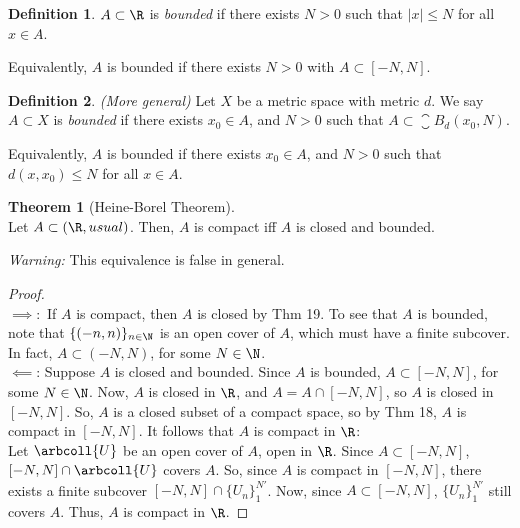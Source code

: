 \documentclass[a5paper]{article}
\theoremstyle{definition}%
\newtheorem{theorem}{Theorem}
\newtheorem*{definition*}{Definition}
\numberwithin{exercise}{section}
\theoremstyle{remark}%
\begin{document}
\begin{definition*}
$A\subset\R$ is \emph{bounded} if there exists $N>0$ such that $|x|\leq N$ for all $x \in A$. 

Equivalently, $A$ is bounded if there exists $N>0$ with $A\subset [-N,N]$. 
\end{definition*}

\begin{definition*}\textit{(More general)}
Let $X$ be a metric space with metric $d$. We say $A\subset X$ is \emph{bounded} if there exists $x_0\in A$, and $N>0$ such that $A\subset \closure{B_d}(x_0,N)$. 

Equivalently, $A$ is bounded if there exists $x_0\in A$, and $N>0$ such that $d(x,x_0)\leq N$ for all $x\in A$. 
\end{definition*}

\begin{highlight}
\begin{theorem}[Heine-Borel Theorem]\mbox{}\\
Let $A\subset (\R, usual)$. Then, $A$ is compact iff $A$ is closed and bounded. 
\end{theorem}
\end{highlight}
\textit{Warning:} This equivalence is false in general. 
\begin{proof}\mbox{}\\
$\implies:$ If $A$ is compact, then $A$ is closed by Thm 19. To see that $A$ is bounded, note that $\{(-n,n)\}_{n\in\N}$ is an open cover of $A$, which must have a finite subcover. In fact, $A\subset (-N,N)$, for some $N\in\N$. \\
%
$\impliedby$: Suppose $A$ is closed and bounded. Since $A$ is bounded, $A\subset[-N,N]$, for some $N\in\N$. Now, $A$ is closed in $\R$, and $A=A\cap[-N,N]$, so $A$ is closed in $[-N,N]$. So, $A$ is a closed subset of a compact space, so by Thm 18, $A$ is compact in $[-N,N]$. It follows that $A$ is compact in $\R$:\\
Let $\arbcoll{U}$ be an open cover of $A$, open in $\R$. Since $A\subset [-N,N]$, $[-N,N]\cap\arbcoll{U}$ covers $A$. So, since $A$ is compact in $[-N,N]$, there exists a finite subcover $[-N,N]\cap \{U_n\}_1^{N'}$. Now, since $A\subset [-N,N]$, $\{U_n\}_1^{N'}$ still covers $A$. Thus, $A$ is compact in $\R$. 
\end{proof}
\end{document}
